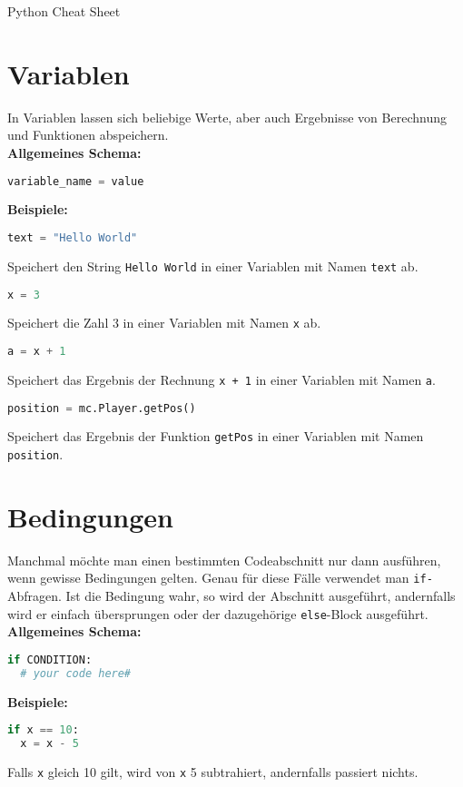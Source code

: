 \documentclass{article}
\begin{document}
	\begin{center}
		{\huge Python Cheat Sheet}
	\end{center}

	\section{Variablen}
		In Variablen lassen sich beliebige Werte, aber auch Ergebnisse von Berechnung und Funktionen abspeichern.\\
		\textbf{Allgemeines Schema:}
		\begin{lstlisting}[language=Python]
variable_name = value
		\end{lstlisting}
		\textbf{Beispiele:}
		\begin{lstlisting}[language=Python]
text = "Hello World"
		\end{lstlisting}
		Speichert den String \texttt{Hello World} in einer Variablen mit Namen \texttt{text} ab.\\
		
		\begin{lstlisting}[language=Python]
x = 3
		\end{lstlisting}
		Speichert die Zahl 3 in einer Variablen mit Namen \texttt{x} ab.\\

		\begin{lstlisting}[language=Python]
a = x + 1
		\end{lstlisting}
		Speichert das Ergebnis der Rechnung \texttt{x + 1} in einer Variablen mit Namen \texttt{a}.\\
		
		\begin{lstlisting}[language=Python]
position = mc.Player.getPos()
		\end{lstlisting}
		Speichert das Ergebnis der Funktion \texttt{getPos} in einer Variablen mit Namen \texttt{position}.
	
	\section{Bedingungen}
	Manchmal möchte man einen bestimmten Codeabschnitt nur dann ausführen, wenn gewisse Bedingungen gelten. Genau für diese Fälle verwendet man \texttt{if-}Abfragen. Ist die Bedingung wahr, so wird der Abschnitt ausgeführt, andernfalls wird er einfach übersprungen oder der dazugehörige \texttt{else}-Block ausgeführt.\\
	\textbf{Allgemeines Schema:}
	\begin{lstlisting}[language=Python]
if CONDITION:
  # your code here#
	\end{lstlisting}
	\textbf{Beispiele:}
	\begin{lstlisting}[language=Python]
if x == 10:
  x = x - 5
	\end{lstlisting}
	Falls \texttt{x} gleich 10 gilt, wird von \texttt{x} 5 subtrahiert, andernfalls passiert nichts.\\
	
\end{document}
